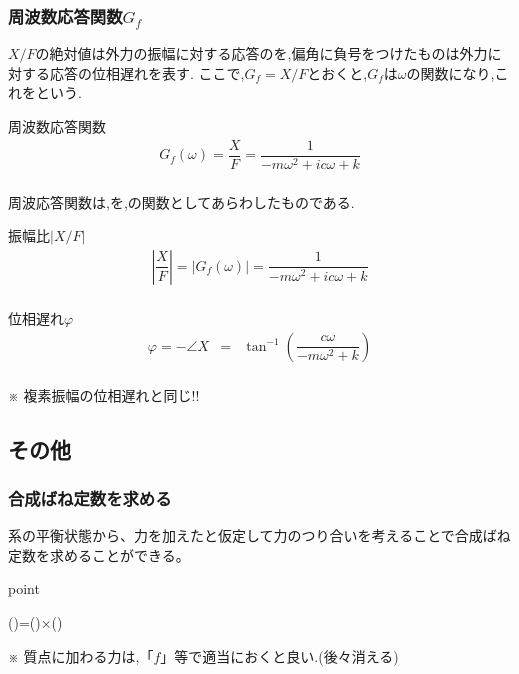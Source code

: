 \documentclass[a4paper]{jsarticle}
\begin{document}
\subsubsection{周波数応答関数$G_f$}
$X/F$の絶対値は外力の振幅に対する応答のを,偏角に負号をつけたものは外力に対する応答の位相遅れを表す.
ここで,$G_f=X/F$とおくと,$G_f$は$\omega$の関数になり,これをという.
\begin{itembox}[l]{周波数応答関数}
    \begin{eqnarray*}
        G_f\left(\omega\right)=\dfrac{X}{F}=\dfrac{1}{-m\omega^2+ic\omega +k}\\
    \end{eqnarray*}
\end{itembox}
周波応答関数は,を,の関数としてあらわしたものである.
\begin{itembox}[l]{振幅比$|X/F|$}
    \begin{eqnarray*}
        \left|\dfrac{X}{F}\right|=|G_f\left(\omega\right)|=\dfrac{1}{-m\omega^2+ic\omega+k}\\
    \end{eqnarray*}
\end{itembox}
\begin{itembox}[l]{位相遅れ$\varphi$}
    \begin{eqnarray*}
        \varphi=-\angle X &=&\tan^{-1}\left(\dfrac{c\omega}{-m\omega^2+k}\right)\\
    \end{eqnarray*}
    \begin{center}
        ※ 複素振幅の位相遅れと同じ!!
    \end{center}
\end{itembox}
\subsection{その他}
\subsubsection{合成ばね定数を求める}
系の平衡状態から、力を加えたと仮定して力のつり合いを考えることで合成ばね定数を求めることができる。
\begin{itembox}[l]{point}
    \begin{center}
        ()\quad=\quad()\quad×\quad()
    \end{center}
\end{itembox}
※ 質点に加わる力は,「$f$」等で適当におくと良い.(後々消える)
\newpage
\end{document}

